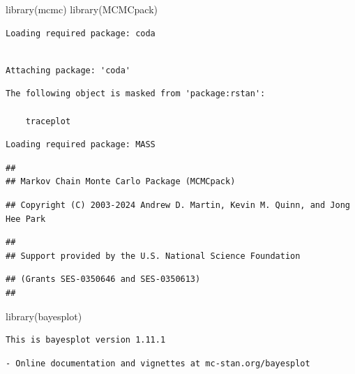 \documentclass[
  10pt,
]{article}
\newenvironment{Shaded}{\begin{snugshade}}{\end{snugshade}}
\newcommand{\FunctionTok}[1]{\textcolor[rgb]{0.28,0.35,0.67}{#1}}
\newcommand{\NormalTok}[1]{\textcolor[rgb]{0.00,0.23,0.31}{#1}}
\begin{document}
\begin{Shaded}
\begin{Highlighting}[]
\FunctionTok{library}\NormalTok{(mcmc)}
\FunctionTok{library}\NormalTok{(MCMCpack)}
\end{Highlighting}
\end{Shaded}

\begin{verbatim}
Loading required package: coda
\end{verbatim}

\begin{verbatim}

Attaching package: 'coda'
\end{verbatim}

\begin{verbatim}
The following object is masked from 'package:rstan':

    traceplot
\end{verbatim}

\begin{verbatim}
Loading required package: MASS
\end{verbatim}

\begin{verbatim}
##
## Markov Chain Monte Carlo Package (MCMCpack)
\end{verbatim}

\begin{verbatim}
## Copyright (C) 2003-2024 Andrew D. Martin, Kevin M. Quinn, and Jong Hee Park
\end{verbatim}

\begin{verbatim}
##
## Support provided by the U.S. National Science Foundation
\end{verbatim}

\begin{verbatim}
## (Grants SES-0350646 and SES-0350613)
##
\end{verbatim}

\begin{Shaded}
\begin{Highlighting}[]
\FunctionTok{library}\NormalTok{(bayesplot)}
\end{Highlighting}
\end{Shaded}

\begin{verbatim}
This is bayesplot version 1.11.1
\end{verbatim}

\begin{verbatim}
- Online documentation and vignettes at mc-stan.org/bayesplot
\end{verbatim}
\end{document}
